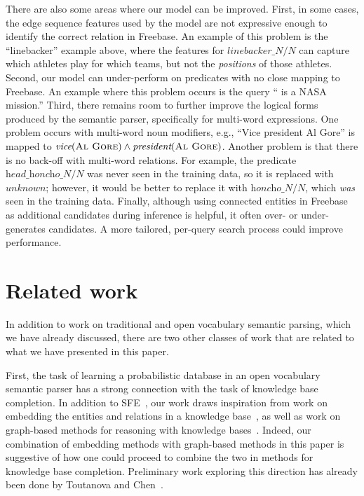 \documentclass[11pt,letterpaper]{article}
\newcommand{\blank}{\underline{\hspace{.5cm}}}
\newcommand{\lexicalpredicate}[1]{\ensuremath{\textit{#1}}}
\newcommand{\entity}[1]{\ensuremath{\textsc{#1}}}
\begin{document}
There are also some areas where our model can be improved. First, in some
cases, the edge sequence features used by the model are not expressive enough
to identify the correct relation in Freebase. An example of this problem is the
``linebacker'' example above, where the features for
\lexicalpredicate{linebacker\_N/N} can capture which athletes play for which
teams, but not the \emph{positions} of those athletes. Second, our model can
under-perform on predicates with no close mapping to Freebase. An example where
this problem occurs is the query ``\blank{} is a NASA mission.'' Third, there
remains room to further improve the logical forms produced by the semantic
parser, specifically for multi-word expressions. One problem occurs with
multi-word noun modifiers, e.g., ``Vice president Al Gore'' is mapped to
$\lexicalpredicate{vice}(\entity{Al Gore}) \land
\lexicalpredicate{president}(\entity{Al Gore})$. Another problem is that there
is no back-off with multi-word relations. For example, the predicate
\lexicalpredicate{head\_honcho\_N/N} was never seen in the training data, so it
is replaced with \lexicalpredicate{unknown}; however, it would be better to
replace it with \lexicalpredicate{honcho\_N/N}, which \emph{was} seen in the
training data. Finally, although using connected entities in Freebase as
additional candidates during inference is helpful, it often over- or
under-generates candidates. A more tailored, per-query search process could
improve performance.

\section{Related work}

In addition to work on traditional and open vocabulary semantic parsing, which
we have already discussed, there are two other classes of work that are related
to what we have presented in this paper.

First, the task of learning a probabilistic database in an open vocabulary
semantic parser has a strong connection with the task of knowledge base
completion.  In addition to SFE~\cite{gardner-2015-sfe}, our work draws
inspiration from work on embedding the entities and relations in a knowledge
base~\cite{riedel-2013-mf-universal-schema,%
nickel-2011-rescal,bordes-2013-transe,nickel-2014-are,%
toutanova-2015-joint-text-kb-embedding}, as well as work on graph-based methods
for reasoning with knowledge
bases~\cite{lao-2010-original-pra,gardner-2014-vector-space-pra,%
neelakantan-2015-rnn-kbc}.  Indeed, our combination of embedding methods with
graph-based methods in this paper is suggestive of how one could proceed to
combine the two in methods for knowledge base completion.  Preliminary work
exploring this direction has already been done by Toutanova and
Chen~.
\end{document}
